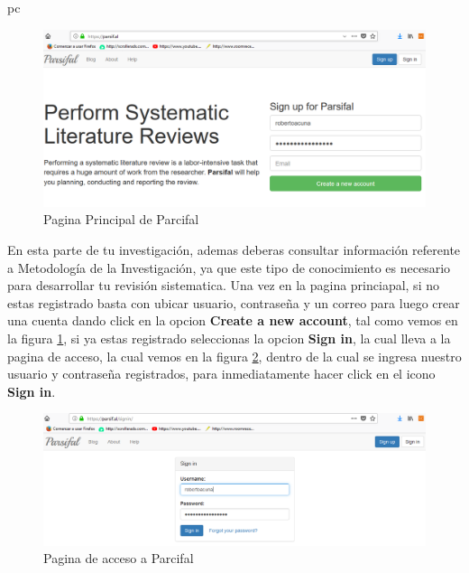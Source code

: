 pc\documentclass[a4paper,12pt,openany]{book}
\begin{document}
\begin{itemize}

        \begin{figure}[H]
        \centering
    	\includegraphics[width=12cm]{parsifal1.png}
        \caption{Pagina Principal de Parcifal}
        \label{fig:Parcifal1}
        \end{figure}

En esta parte de tu investigación, ademas deberas consultar información referente a Metodología de la Investigación, ya que este tipo de conocimiento es necesario para desarrollar tu revisión sistematica. Una vez en la pagina princiapal, si no estas registrado basta con ubicar usuario, contraseña y un correo para luego crear una cuenta dando click en la opcion \textbf{Create a new account}, tal como vemos en la figura \ref{fig:Parcifal1}, si ya estas registrado seleccionas la opcion \textbf{Sign in}, la cual lleva a la pagina de acceso, la cual vemos en la figura \ref{fig:Parcifal2}, dentro de la cual se ingresa nuestro usuario y contraseña registrados, para inmediatamente hacer click en el icono \textbf{Sign in}.

        \begin{figure}[H]
        \centering
    	\includegraphics[width=12cm]{parsifal2.png}
        \caption{Pagina de acceso a Parcifal}
        \label{fig:Parcifal2}
        \end{figure}


\end{itemize}
\end{document}
